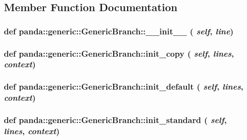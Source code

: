 \subsection{Member Function Documentation}
\hypertarget{classpanda_1_1generic_1_1GenericBranch_ad1236b35769c2d88646b49b013ad070d}{
\subsubsection[{\_\-\_\-init\_\-\_\-}]{\setlength{\rightskip}{0pt plus 5cm}def panda::generic::GenericBranch::\_\-\_\-init\_\-\_\- ( {\em self}, \/   {\em line})}}
\label{classpanda_1_1generic_1_1GenericBranch_ad1236b35769c2d88646b49b013ad070d}
\hypertarget{classpanda_1_1generic_1_1GenericBranch_a1f0289b699c648c6e795d7f61a79b45f}{
\subsubsection[{init\_\-copy}]{\setlength{\rightskip}{0pt plus 5cm}def panda::generic::GenericBranch::init\_\-copy ( {\em self}, \/   {\em lines}, \/   {\em context})}}
\label{classpanda_1_1generic_1_1GenericBranch_a1f0289b699c648c6e795d7f61a79b45f}
\hypertarget{classpanda_1_1generic_1_1GenericBranch_a2e31ded0f3f62fbbbb8fc73707793b8d}{
\subsubsection[{init\_\-default}]{\setlength{\rightskip}{0pt plus 5cm}def panda::generic::GenericBranch::init\_\-default ( {\em self}, \/   {\em lines}, \/   {\em context})}}
\label{classpanda_1_1generic_1_1GenericBranch_a2e31ded0f3f62fbbbb8fc73707793b8d}
\hypertarget{classpanda_1_1generic_1_1GenericBranch_aef90d8609c13cd7bd67f557746674a8c}{
\subsubsection[{init\_\-standard}]{\setlength{\rightskip}{0pt plus 5cm}def panda::generic::GenericBranch::init\_\-standard ( {\em self}, \/   {\em lines}, \/   {\em context})}}
